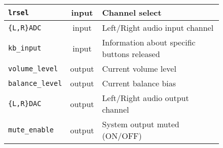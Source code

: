 \begin{figure}[h]
  \centering
  \begin{tabular}{|l|c|l}
    \hline
    \verb+lrsel+ & input & Channel select \\    \hline
    \verb+{L,R}ADC+ & input & Left/Right audio input channel \\    \hline
    \verb+kb_input+ & input & Information about specific buttons released \\    \hline
    \verb+volume_level+ & output & Current volume level \\    \hline
    \verb+balance_level+ & output & Current balance bias \\    \hline
    \verb+{L,R}DAC+ & output & Left/Right audio output channel \\    \hline
    \verb+mute_enable+ & output & System output muted (ON/OFF) \\    \hline
  \end{tabular}
\end{figure}